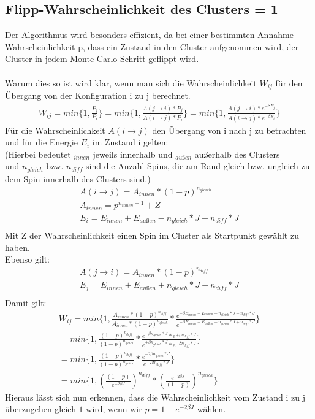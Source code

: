\subsection{Flipp-Wahrscheinlichkeit des Clusters = 1}
Der Algorithmus wird besonders effizient, da bei einer bestimmten Annahme-Wahrscheinlichkeit p, dass ein Zustand in den Cluster aufgenommen wird, der Cluster in jedem Monte-Carlo-Schritt geflippt wird.\\\\
Warum dies so ist wird klar, wenn man sich die Wahrscheinlichkeit $W_{ij}$ für den Übergang von der Konfiguration i zu j berechnet.
\begin{align}
W_{ij} = min\{1, \frac{P_j}{P_i} \} = min\{1, \frac{A(j \rightarrow i) * P_j}{A(i \rightarrow j) * P_i} \} = min\{1, \frac{A(j \rightarrow i) * e^{-\beta E_j}}{A(i \rightarrow j) * e^{-\beta E_i}} \}
\end{align}
Für die Wahrscheinlichkeit $A(i \rightarrow j)$ den Übergang von i nach j zu betrachten und für die Energie $E_i$ im Zustand i gelten:\\
(Hierbei bedeutet $_{innen}$ jeweils innerhalb und $_{außen}$ außerhalb des Clusters\\
und $n_{gleich}$ bzw. $n_{diff}$ sind die Anzahl Spins, die am Rand gleich bzw. ungleich zu dem Spin innerhalb des Clusters sind.)
\begin{align}
A(i \rightarrow j)=A_{innen} * (1 - p)^{n_{gleich}}\\
A_{innen} = p^{n_{innen}-1} + Z\\
E_i = E_{innen} + E_{außen} - n_{gleich} * J + n_{diff} * J\\
\end{align}
Mit Z der Wahrscheinlichkeit einen Spin im Cluster als Startpunkt gewählt zu haben.\\
Ebenso gilt:
\begin{align}
A(j \rightarrow i)=A_{innen} * (1 - p)^{n_{diff}}\\
E_j = E_{innen} + E_{außen} + n_{gleich} * J - n_{diff} * J\\
\end{align}
Damit gilt:
\begin{align}
W_{ij} = min\{1, \frac{A_{innen}*(1-p)^{n_{diff}}}{A_{innen}*(1-p)^{n_{gleich}}} * \frac{e^{-\beta E_{innen} + E_{außen} + n_{gleich} * J - n_{diff} * J}}{e^{-\beta E_{innen} + E_{außen} - n_{gleich} * J + n_{diff} * J}}\}\\
= min\{1, \frac{(1-p)^{n_{diff}}}{(1-p)^{n_{gleich}}} * \frac{e^{-\beta n_{gleich} * J} * e^{+\beta n_{diff} * J}}{e^{+\beta n_{gleich} * J} * e^{-\beta n_{diff} * J}}\}\\
= min\{1, \frac{(1-p)^{n_{diff}}}{(1-p)^{n_{gleich}}} * \frac{e^{-2\beta n_{gleich} * J}}{e^{-2\beta n_{diff} * J}}\}\\
= min\{1, \left(\frac{(1-p)}{e^{-2\beta J}}\right)^{n_{diff}} * \left(\frac{e^{-2\beta J}}{(1-p)}\right)^{n_{gleich}}\}
\end{align}
Hieraus lässt sich nun erkennen, dass die Wahrscheinlichkeit vom Zustand i zu j überzugehen gleich $1$ wird, wenn wir $p = 1 - e^{-2\beta J}$ wählen.

